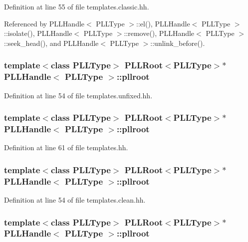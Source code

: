 Definition at line 55 of file templates.classic.hh.

Referenced by PLLHandle$<$ PLLType $>$::el(), PLLHandle$<$ PLLType $>$::isolate(), PLLHandle$<$ PLLType $>$::remove(), PLLHandle$<$ PLLType $>$::seek\_\-head(), and PLLHandle$<$ PLLType $>$::unlink\_\-before().
\subsubsection{\setlength{\rightskip}{0pt plus 5cm}template$<$class PLLType$>$ {\bf PLLRoot}$<${\bf PLLType}$>$$\ast$ PLLHandle$<$ {\bf PLLType} $>$::pllroot\hspace{0.3cm}{\tt  [protected]}}\label{classPLLHandle_n10}




Definition at line 54 of file templates.unfixed.hh.
\subsubsection{\setlength{\rightskip}{0pt plus 5cm}template$<$class PLLType$>$ {\bf PLLRoot}$<${\bf PLLType}$>$$\ast$ PLLHandle$<$ {\bf PLLType} $>$::pllroot\hspace{0.3cm}{\tt  [protected]}}\label{classPLLHandle_n6}




Definition at line 61 of file templates.hh.
\subsubsection{\setlength{\rightskip}{0pt plus 5cm}template$<$class PLLType$>$ {\bf PLLRoot}$<${\bf PLLType}$>$$\ast$ PLLHandle$<$ {\bf PLLType} $>$::pllroot\hspace{0.3cm}{\tt  [protected]}}\label{classPLLHandle_n3}




Definition at line 54 of file templates.clean.hh.
\subsubsection{\setlength{\rightskip}{0pt plus 5cm}template$<$class PLLType$>$ {\bf PLLRoot}$<${\bf PLLType}$>$$\ast$ PLLHandle$<$ {\bf PLLType} $>$::pllroot\hspace{0.3cm}{\tt  [protected]}}\label{classPLLHandle_n0}




